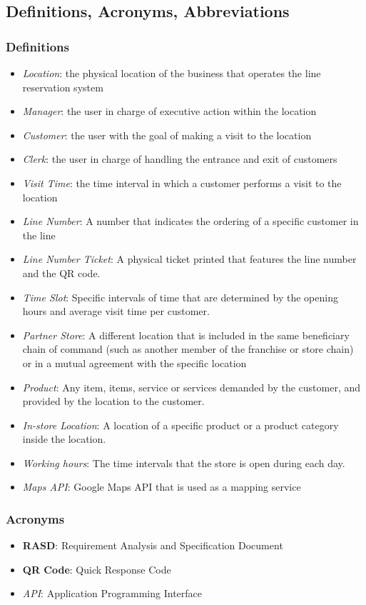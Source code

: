 \subsection{Definitions, Acronyms, Abbreviations}
\subsubsection{Definitions}
\begin{itemize}
    \item \textit{Location}: the physical location of the business that operates the line reservation system
    \item \textit{Manager}: the user in charge of executive action within the location
    \item \textit{Customer}: the user with the goal of making a visit to the location
    \item \textit{Clerk}: the user in charge of handling the entrance and exit of customers
    \item \textit{Visit Time}: the time interval in which a customer performs a visit to the location
    \item \textit{Line Number}: A number that indicates the ordering of a specific customer in the line
    \item \textit{Line Number Ticket}: A physical ticket printed that features the line number and the QR code.
    \item \textit{Time Slot}: Specific intervals of time that are determined by the opening hours and average visit time per customer.
    \item \textit{Partner Store}: A different location that is included in the same beneficiary chain of command (such as another member of the franchise or store chain) or in a mutual agreement with the specific location
    \item \textit{Product}: Any item, items, service or services demanded by the customer, and provided by the location to the customer.
    \item \textit{In-store Location}: A location of a specific product or a product category inside the location.
    \item \textit{Working hours}: The time intervals that the store is open during each day.
    \item \textit{Maps API}: Google Maps API that is used as a mapping service
\end{itemize}
\subsubsection{Acronyms}
\begin{itemize}
    \item \textbf{RASD}: Requirement Analysis and Specification Document
    \item \textbf{QR Code}: Quick Response Code
    \item \textit{API}: Application Programming Interface
\end{itemize}
